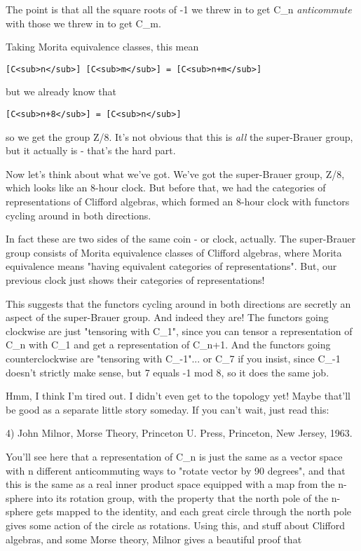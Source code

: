 The point is that all the square roots of -1 we threw in to get C_{n} 
\emph{anticommute} with those we threw in to get C_{m}.   

Taking Morita equivalence classes, this mean

\begin{verbatim}
[C<sub>n</sub>] [C<sub>m</sub>] = [C<sub>n+m</sub>] 
\end{verbatim}
    
but we already know that 

\begin{verbatim}
[C<sub>n+8</sub>] = [C<sub>n</sub>]
\end{verbatim}
    
so we get the group Z/8.  It's not obvious that this is 
\emph{all} the super-Brauer
group, but it actually is - that's the hard part.

Now let's think about what we've got.   We've got the super-Brauer group, 
Z/8, which looks like an 8-hour clock.  But before that, we had the categories 
of representations of Clifford algebras, which formed an 8-hour clock with 
functors cycling around in both directions.

In fact these are two sides of the same coin - or clock, actually.  The 
super-Brauer group consists of Morita equivalence classes of Clifford algebras, 
where Morita equivalence means "having equivalent categories of 
representations".  But, our previous clock just shows their categories of 
representations!

This suggests that the functors cycling around in both directions are secretly 
an aspect of the super-Brauer group.  And indeed they are!  The functors going 
clockwise are just "tensoring with C_{1}", since you can 
tensor a representation 
of C_{n} with C_{1} 
and get a representation of C_{n+1}.  And the functors going
counterclockwise are "tensoring with C_{-1}"... or 
C_{7} if you insist, since C_{-1} doesn't strictly 
make sense, but 7 equals -1 mod 8, so it does the
same job.

Hmm, I think I'm tired out.  I didn't even get to the topology yet!  Maybe
that'll be good as a separate little story someday.  If you can't wait, 
just read this: 

4) John Milnor, Morse Theory, Princeton U. Press, Princeton, New Jersey, 1963.

You'll see here that a representation of C_{n} is just the same as a vector
space with n different anticommuting ways to "rotate vector by 90 degrees",
and that this is the same as a real inner product space equipped with a map
from the n-sphere into its rotation group, with the property that the north 
pole of the n-sphere gets mapped to the identity, and each great circle 
through the north pole gives some action of the circle as rotations.  Using 
this, and stuff about Clifford algebras, and some Morse theory, Milnor gives a
beautiful proof that 

